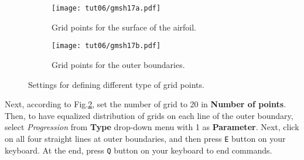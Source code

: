 \begin{figure}[htbp]
    \centering
     \begin{subfigure}[b]{.4\textwidth}
         \centering
         \texttt{[image: tut06/gmsh17a.pdf]}
         \caption{Grid points for the surface of the airfoil.}
         \label{fig6:gmsh17 a}
     \end{subfigure}
     \hfill
     \begin{subfigure}[b]{.4\textwidth}
         \centering
         \texttt{[image: tut06/gmsh17b.pdf]}
         \caption{Grid points for the outer boundaries.}
         \label{fig6:gmsh17 b}
     \end{subfigure}  
    \caption{Settings for defining different type of grid points.}
    \label{fig6:gmsh17}
\end{figure}
Next, according to Fig.\ref{fig6:gmsh17 b}, set the number of grid to 20 in \textbf{Number of points}. Then, to have equalized distribution of grids on each line of the outer boundary, select \textit{Progression} from \textbf{Type} drop-down menu with 1 as \textbf{Parameter}. Next, click on all four straight lines at outer boundaries, and then press \texttt{E} button on your keyboard. At the end, press \texttt{Q} button on your keyboard to end commands.

